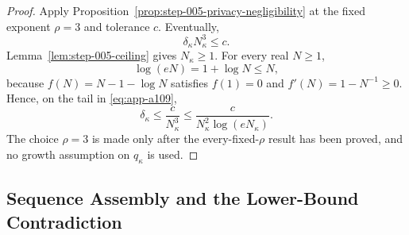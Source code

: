 \begin{proof}
Apply Proposition~\ref{prop:step-005-privacy-negligibility} at the
fixed exponent \(\rho=3\) and tolerance \(c\).  Eventually,
\begin{equation}
\delta_\kappa N_\kappa^3\leq c.
\label{eq:app-a109}
\end{equation}
Lemma~\ref{lem:step-005-ceiling} gives \(N_\kappa\geq1\).  For every
real \(N\geq1\),
\begin{equation}
\log(eN)=1+\log N\leq N,
\label{eq:app-a110}
\end{equation}
because \(f(N)=N-1-\log N\) satisfies \(f(1)=0\) and
\(f'(N)=1-N^{-1}\geq0\).  Hence, on the tail in \eqref{eq:app-a109},
\[
\delta_\kappa
\leq\frac{c}{N_\kappa^3}
\leq\frac{c}{N_\kappa^2\log(eN_\kappa)}.
\]
The choice \(\rho=3\) is made only after the every-fixed-\(\rho\)
result has been proved, and no growth assumption on \(q_\kappa\) is
used.
\end{proof}

\subsection{Sequence Assembly and the Lower-Bound Contradiction}
\label{app:sequence-assembly}

